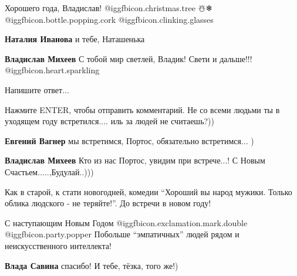  
 
 
 
 
\zzSecCmt

\begin{itemize} %
Хорошего года, Владислав! @igg{fbicon.christmas.tree} ☃️❄ @igg{fbicon.bottle.popping.cork}  @igg{fbicon.clinking.glasses} 

\textbf{Наталия Иванова} и тебе, Наташенька

\textbf{Владислав Михеев} С тобой мир светлей, Владик! Свети и дальше!!! @igg{fbicon.heart.sparkling} 

Напишите ответ...

Нажмите ENTER, чтобы отправить комментарий.
Не со всеми людьми ты в уходящем году встретился.... иль за людей не считаешь?))

\textbf{Евгений Вагнер} мы встретимся, Портос, обязательно встретимся... )

\textbf{Владислав Михеев} Кто из нас Портос, увидим при встрече...!
С Новым Счастьем.....,Будулай..)))


Как в старой, к стати новогодней, комедии \enquote{Хороший вы народ мужики.
Только облика людского - не теряйте!}. До встречи в новом году!


С наступающим Новым Годом @igg{fbicon.exclamation.mark.double}
@igg{fbicon.party.popper}  Побольше \enquote{эмпатичных} людей рядом и
неискусственного интеллекта!

\textbf{Влада Савина} спасибо! И тебе, тёзка, того же!)

\end{itemize} %
